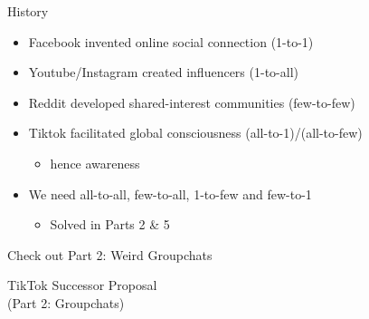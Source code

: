 \documentclass[aspectratio=169]{beamer}
\begin{document}
\begin{frame}{History}
\vspace{-0.7in}
\begin{itemize}
    \item Facebook invented online social connection (1-to-1)
    \item Youtube/Instagram created influencers (1-to-all)
    \item Reddit developed shared-interest communities (few-to-few)
    \item Tiktok facilitated global consciousness (all-to-1)/(all-to-few)
    \begin{itemize}
        \item hence  awareness
    \end{itemize}
    \item We need all-to-all, few-to-all, 1-to-few and few-to-1
    \begin{itemize}
        \item Solved in Parts 2 \& 5
    \end{itemize}
\end{itemize}
\end{frame}

\begin{frame}{Check out Part 2: Weird Groupchats}
\end{frame}

\begin{frame}
    \centering
    \Huge TikTok Successor Proposal \\
    \Huge (Part 2: Groupchats)
\end{frame}
\end{document}
